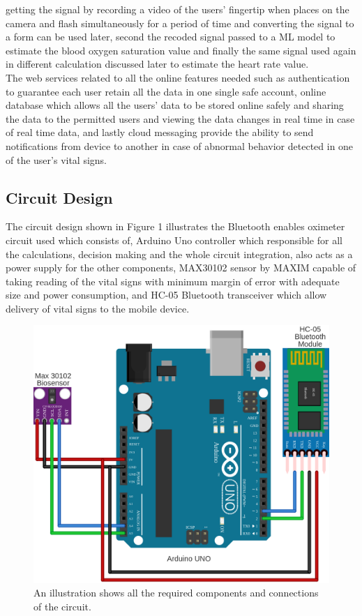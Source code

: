 \documentclass{bmcart}
\begin{document}
getting the signal by recording a video of the users' fingertip when places on
the camera and flash simultaneously for a period of time and converting the
signal to a form can be used later, second the recoded signal passed to a ML
model to estimate the blood oxygen saturation value and finally the same signal
used again in different calculation discussed later to estimate the heart rate
value.\\
The web services related to all the online features needed such as
authentication to  guarantee each user retain all the data in one single safe
account, online database which allows all the users' data to be stored online
safely and sharing the data to the permitted users and viewing the data changes
in real time in case of real time data, and  lastly cloud messaging provide the
ability to send notifications from device to another in case of abnormal
behavior detected in one of the user's vital signs.\\

\subsection*{Circuit Design}
The circuit design shown in Figure 1 illustrates the Bluetooth enables oximeter
circuit used which consists of,  Arduino Uno controller which responsible for
all the calculations, decision making and the whole circuit integration, also
acts as a power supply for the other components, MAX30102 sensor by MAXIM
capable of taking reading of the vital signs with minimum margin of error with
adequate size and power consumption, and  HC-05 Bluetooth transceiver which
allow delivery of vital signs to the mobile device.

\begin{figure}[h!]
  \includegraphics[width=.75\linewidth]{png_images/circuit_desing.png}
  \caption{
      An illustration shows all the required components and connections of the circuit.}
\end{figure}
\FloatBarrier
\end{document}
